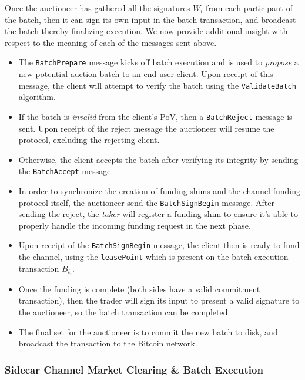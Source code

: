 \documentclass[10pt,a4paper]{article}
\theoremstyle{definition}
\begin{document}
Once the auctioneer has gathered all the signatures $W_i$ from each participant
of the batch, then it can sign its own input in the batch transaction, and
broadcast the batch thereby finalizing execution. We now provide additional
insight with respect to the meaning of each of the messages sent above.
\begin{itemize}
    \item The \texttt{BatchPrepare} message kicks off batch execution and is
        used to \emph{propose} a new potential auction batch to an end user
        client. Upon receipt of this message, the client will attempt to verify
        the batch using the \texttt{ValidateBatch} algorithm. 

    \item If the batch is \emph{invalid} from the client's PoV, then a
        \texttt{BatchReject} message is sent. Upon receipt of the reject
        message the auctioneer will resume the protocol, excluding the
        rejecting client.

    \item Otherwise, the client accepts the batch after verifying its integrity
        by sending the \texttt{BatchAccept} message.

    \item In order to synchronize the creation of funding shims and the channel
        funding protocol itself, the auctioneer send the
        \texttt{BatchSignBegin} message. After sending the reject, the
        \emph{taker} will register a funding shim to ensure it's able to
        properly handle the incoming funding request in the next phase.

    \item Upon receipt of the \texttt{BatchSignBegin} message, the client then
        is ready to fund the channel, using the \texttt{leasePoint} which is
        present on the batch execution transaction $B_{t_i}$.

    \item Once the funding is complete (both sides have a valid commitment
        transaction), then the trader will sign its input to present a valid
        signature to the auctioneer, so the batch transaction can be completed.

    \item The final set for the auctioneer is to commit the new batch to disk,
        and broadcast the transaction to the Bitcoin network.
\end{itemize}

\subsubsection{Sidecar Channel Market Clearing \& Batch Execution}
\end{document}
